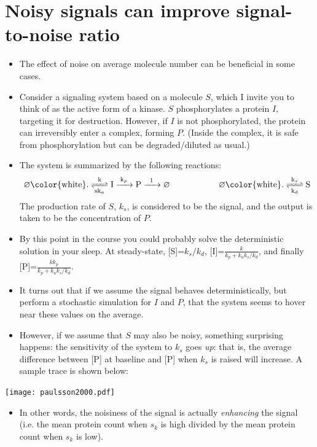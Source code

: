 \documentclass{article}
\begin{document}
\section*{Noisy signals can improve signal-to-noise ratio}
\begin{itemize}
\item The effect of noise on average molecule number can be beneficial in some cases.
\item Consider a signaling system based on a molecule $S$, which I invite you to think of as the active form of a kinase. $S$ phosphorylates a protein $I$, targeting it for destruction. However, if $I$ is not phosphorylated, the protein can irreversibly enter a complex, forming $P$. (Inside the complex, it is safe from phosphorylation but can be degraded/diluted as usual.)
\item The system is summarized by the following reactions:
\[ \ce{\varnothing {\color{white} .} <=>[k][sk_a] I ->[k_p] P ->[1] \varnothing } \hspace{2 cm} \ce{\varnothing {\color{white} .} <=>[k_s][k_d] S } \]
The production rate of $S$, $k_s$, is considered to be the signal, and the output is taken to be the concentration of $P$.
\item By this point in the course you could probably solve the deterministic solution in your sleep. At steady-state, [S]=$k_s/k_d$, [I]=$\frac{k}{k_p + k_ak_s/k_d}$, and finally [P]=$ \frac{kk_p}{k_p + k_ak_s/k_d}$.
\item It turns out that if we assume the signal behaves deterministically, but perform a stochastic simulation for $I$ and $P$, that the system seems to hover near these values on the average.
\item However, if we assume that $S$ may also be noisy, something surprising happens: the sensitivity of the system to $k_s$ goes \textit{up}: that is, the average difference between [P] at baseline and [P] when $k_s$ is raised will increase. A sample trace is shown below: 
\end{itemize}
\begin{center}
\texttt{[image: paulsson2000.pdf]}
\end{center}
\begin{itemize}
\item In other words, the noisiness of the signal is actually \textit{enhancing} the signal (i.e. the mean protein count when $s_k$ is high divided by the mean protein count when $s_k$ is low).
\end{itemize}
\end{document}
